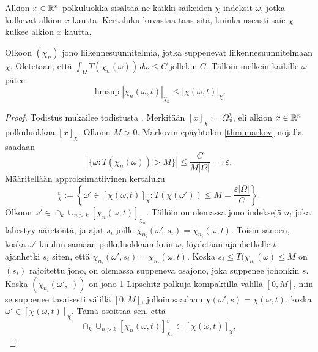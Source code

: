 Alkion $x\in \mathbb{R}^n$ polkuluokka sisältää ne kaikki säikeiden $\chi$ indeksit $\omega$, jotka kulkevat alkion $x$ kautta. Kertaluku kuvastaa taas sitä, kuinka useasti säie $\chi$ kulkee alkion $x$ kautta.

\begin{theorem} \label{thm:multiplicityXnLeX}
    Olkoon $(\chi_n)$ jono liikennesuunnitelmia, jotka suppenevat liikennesuunnitelmaan $\chi$. Oletetaan, että $\int_\Omega T(\chi_n(\omega))\, d\omega \le C$ jollekin $C$. Tällöin melkein-kaikille $\omega$ pätee
    \begin{equation*}
        \limsup |\chi_n(\omega, t)|_{\chi_n} \le |\chi(\omega, t)|_\chi.
    \end{equation*}
\end{theorem}
\begin{proof}
    Todistus mukailee todistusta \cite[p. 31-32]{OptimalTransportationNetworks}. Merkitään $[x]_\chi := \Omega_x^\chi$, eli alkion $x\in \mathbb{R}^n$ polkuluokkaa $[x]_\chi$. Olkoon $M > 0.$ Markovin epäyhtälön \ref{thm:markov} nojalla saadaan
    \begin{equation*}
        |\{\omega : T(\chi_n(\omega)) > M\}| \le \frac{C}{M|\Omega|} =: \varepsilon.
    \end{equation*}
    Määritellään approksimatiivinen kertaluku
    \begin{equation*}
        [\chi(\omega,t)]_\chi^\varepsilon := \left\{\omega' \in [\chi(\omega, t)]_\chi : T(\chi(\omega')) \le M = \frac{\varepsilon|\Omega|}{C}\right\}.
    \end{equation*}
    Olkoon $\omega' \in \cap_k \cup_{n > k} [\chi_n(\omega, t)]_{\chi_n}$. Tällöin on olemassa jono  indeksejä $n_i$ joka lähestyy ääretöntä, ja ajat $s_i$ joille $\chi_{n_i}(\omega',s_i) = \chi_{n_i}(\omega, t)$. Toisin sanoen, koska $\omega'$ kuuluu samaan polkuluokkaan kuin $\omega$, löydetään ajanhetkelle $t$ ajanhetki $s_i$ siten, että $\chi_{n_i}(\omega',s_i) = \chi_{n_i}(\omega, t)$. Koska $s_i\le T(\chi_{n_i}(\omega) \le M$ on $(s_i)$ rajoitettu jono, on olemassa suppeneva osajono, joka suppenee johonkin $s$. Koska $(\chi_{n_i}(\omega', \cdot))$ on jono 1-Lipschitz-polkuja kompaktilla välillä $[0, M]$, niin se suppenee tasaisesti välillä $[0, M]$, jolloin saadaan $\chi(\omega', s) = \chi(\omega, t)$, koska $\omega' \in [\chi(\omega, t)]_\chi$. Tämä osoittaa sen, että 
    \begin{equation*}
        \cap_k \cup_{n > k} [\chi_n(\omega, t)]_{\chi_n}^\varepsilon \subset [\chi(\omega, t)]_\chi,
    \end{equation*}

\end{proof}
